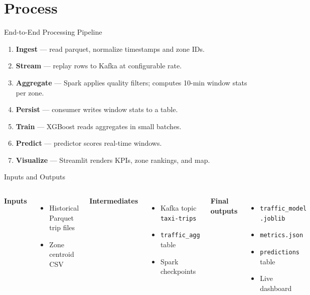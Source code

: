 \documentclass[aspectratio=169,professionalfonts]{beamer}
\begin{document}
%
\section{Process}

\begin{frame}{End-to-End Processing Pipeline}
\begin{enumerate}
  \item \textbf{Ingest} — read parquet, normalize timestamps and zone IDs.
  \item \textbf{Stream} — replay rows to Kafka at configurable rate.
  \item \textbf{Aggregate} — Spark applies quality filters; computes 10-min window stats per zone.
  \item \textbf{Persist} — consumer writes window stats to a table.
  \item \textbf{Train} — XGBoost reads aggregates in small batches.
  \item \textbf{Predict} — predictor scores real-time windows.
  \item \textbf{Visualize} — Streamlit renders KPIs, zone rankings, and map.
\end{enumerate}
\end{frame}

\begin{frame}{Inputs and Outputs}
\begin{columns}[T]
\textbf{Inputs}
\begin{itemize}
  \item Historical Parquet trip files
  \item Zone centroid CSV
\end{itemize}

\textbf{Intermediates}
\begin{itemize}
  \item Kafka topic \texttt{taxi-trips}
  \item \texttt{traffic\_agg} table
  \item Spark checkpoints
\end{itemize}

\textbf{Final outputs}
\begin{itemize}
  \item \texttt{traffic\_model}\\\texttt{.joblib}
  \item \texttt{metrics.json}
  \item \texttt{predictions} table
  \item Live dashboard
\end{itemize}
\end{columns}
\end{frame}
\end{document}
